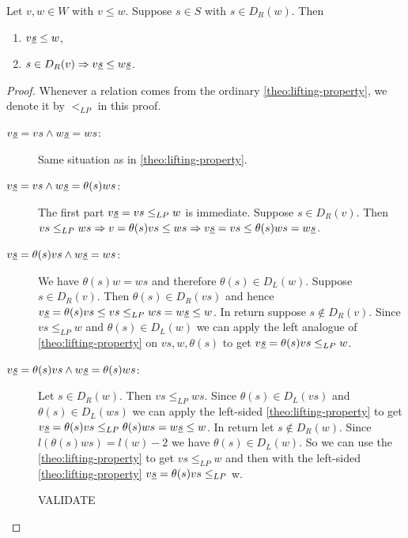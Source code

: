 \begin{lemm}
	Let $v,w \in W$ with $v \leq w$. Suppose $s \in S$ with $s \in D_R(w)$. Then
	\begin{enumerate}
		\item $v \underline{s} \leq w$,
		\item $s \in D_R(v) \Rightarrow v \underline{s} \leq w \underline{s}$.
	\end{enumerate}

	\begin{proof}
		Whenever a relation comes from the ordinary \ref{theo:lifting-property}, we denote it by $<_{LP}$ in this proof.
		\begin{description}
			\item[$v \underline{s} = vs \wedge w \underline{s} = ws$:]
			Same situation as in \ref{theo:lifting-property}.
			\item[$v \underline{s} = vs \wedge w \underline{s} = \theta(s)ws$:]
			The first part $v \underline{s} = vs \leq_{LP} w$ is immediate. Suppose $s \in D_R(v)$. Then $vs \leq_{LP} ws \Rightarrow v = \theta(s)vs \leq ws \Rightarrow v \underline{s} = vs \leq \theta(s)ws = w \underline{s}$. 
			\item[$v \underline{s} = \theta(s)vs \wedge w \underline{s} = ws$:]
			We have $\theta(s)w = ws$ and therefore $\theta(s) \in D_L(w)$. Suppose $s \in D_R(v)$. Then $\theta(s) \in D_R(vs)$ and hence $v \underline{s} = \theta(s)vs \leq vs \leq_{LP} ws = w \underline{s} \leq w$. In return suppose $s \notin D_R(v)$. Since $vs \leq_{LP} w$ and $\theta(s) \in D_L(w)$ we can apply the left analogue of \ref{theo:lifting-property} on $vs,w,\theta(s)$ to get $v \underline{s} = \theta(s)vs \leq_{LP} w$.
			\item[$v \underline{s} = \theta(s)vs \wedge w \underline{s} = \theta(s)ws$:]
			Let $s \in D_R(w)$. Then $vs \leq_{LP} ws$. Since $\theta(s) \in D_L(vs)$ and $\theta(s) \in D_L(ws)$ we can apply the left-sided \ref{theo:lifting-property} to get $v \underline{s} = \theta(s)vs \leq_{LP} \theta(s)ws = w \underline{s} \leq w$. In return let $s \notin D_R(w)$. Since $l(\theta(s)ws) = l(w) - 2$ we have $\theta(s) \in D_L(w)$. So we can use the \ref{theo:lifting-property} to get $vs \leq_{LP} w$ and then with the left-sided  \ref{theo:lifting-property} $v \underline{s} = \theta(s)vs \leq_{LP}$ w. \qedhere

			\todo VALIDATE
		\end{description}
	\end{proof}
\end{lemm}

